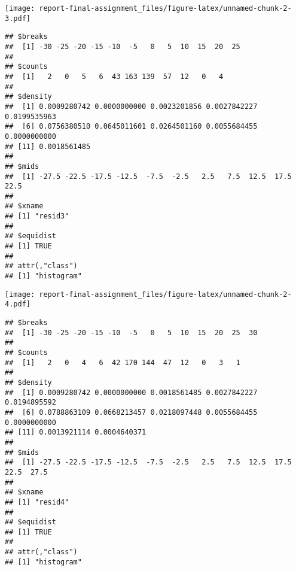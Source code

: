 \documentclass[
]{article}
\begin{document}
\texttt{[image: report-final-assignment\_files/figure-latex/unnamed-chunk-2-3.pdf]}

\begin{verbatim}
## $breaks
##  [1] -30 -25 -20 -15 -10  -5   0   5  10  15  20  25
## 
## $counts
##  [1]   2   0   5   6  43 163 139  57  12   0   4
## 
## $density
##  [1] 0.0009280742 0.0000000000 0.0023201856 0.0027842227 0.0199535963
##  [6] 0.0756380510 0.0645011601 0.0264501160 0.0055684455 0.0000000000
## [11] 0.0018561485
## 
## $mids
##  [1] -27.5 -22.5 -17.5 -12.5  -7.5  -2.5   2.5   7.5  12.5  17.5  22.5
## 
## $xname
## [1] "resid3"
## 
## $equidist
## [1] TRUE
## 
## attr(,"class")
## [1] "histogram"
\end{verbatim}

\texttt{[image: report-final-assignment\_files/figure-latex/unnamed-chunk-2-4.pdf]}

\begin{verbatim}
## $breaks
##  [1] -30 -25 -20 -15 -10  -5   0   5  10  15  20  25  30
## 
## $counts
##  [1]   2   0   4   6  42 170 144  47  12   0   3   1
## 
## $density
##  [1] 0.0009280742 0.0000000000 0.0018561485 0.0027842227 0.0194895592
##  [6] 0.0788863109 0.0668213457 0.0218097448 0.0055684455 0.0000000000
## [11] 0.0013921114 0.0004640371
## 
## $mids
##  [1] -27.5 -22.5 -17.5 -12.5  -7.5  -2.5   2.5   7.5  12.5  17.5  22.5  27.5
## 
## $xname
## [1] "resid4"
## 
## $equidist
## [1] TRUE
## 
## attr(,"class")
## [1] "histogram"
\end{verbatim}
\end{document}
